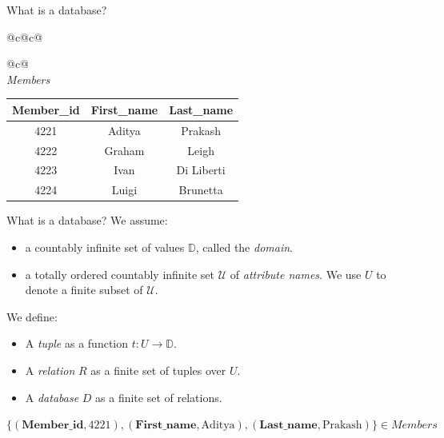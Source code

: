 \documentclass{beamer}
\begin{document}
\begin{frame}{What is a database?}
{\begin{tabular}{@{}c@{\hspace{1.5cm}}c@{}}
\begin{tabular}{@{}c@{}}
        \\[1.8cm]

        \textit{Members} \\[0.15cm]
        \begin{tabular}{|c|c|c|}
          \hline
          \textbf{Member\_id} & \textbf{First\_name} & \textbf{Last\_name} \\ \hline
          4221                & Aditya               & Prakash             \\ \hline
          4222                & Graham               & Leigh               \\ \hline
          4223                & Ivan                 & Di Liberti          \\ \hline
          4224                & Luigi                & Brunetta            \\ \hline
        \end{tabular}
      \end{tabular}
    \end{tabular}
  }
\end{frame}

\begin{frame}{What is a database?}
  We assume:\pause
  \begin{itemize}
    \item a countably infinite set of values $\mathbb{D}$, called the \emph{domain}.\pause
    \item a totally ordered countably infinite set $\mathcal{U}$ of \emph{attribute names}. We use $U$ to denote a finite subset of $\mathcal{U}$.\pause
  \end{itemize}

  We define:\pause
  \begin{itemize}
    \item A \emph{tuple} as a function $t : U \to \mathbb{D}$.\pause
    \item A \emph{relation} $R$ as a finite set of tuples over $U$.\pause
    \item A \emph{database} $D$ as a finite set of relations.\pause
  \end{itemize}

  \bigskip

  $\{(\textbf{Member\_id}, 4221), (\textbf{First\_name}, \text{Aditya}), (\textbf{Last\_name}, \text{Prakash})\} \in Members$
\end{frame}
\end{document}

